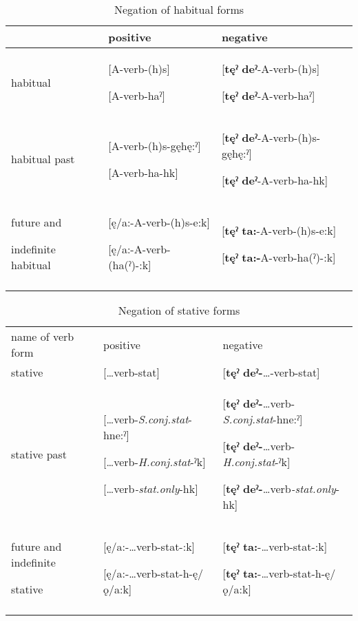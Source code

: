 \begin{table}
\caption{Negation of habitual forms}
\label{tab:1:habneg}
\scriptsize{
\begin{tabularx}{\textwidth}{XXX} 
\lsptoprule
& positive & negative\\
\midrule

habitual & [A-verb-(h)s]

[A-verb-haˀ] & [\textbf{tęˀ} \textbf{deˀ}{}-A-verb-(h)s]

[\textbf{tęˀ} \textbf{deˀ}{}-A-verb-haˀ]\\
habitual past & [A-verb-(h)s-gęhę:ˀ]

[A-verb-ha-hk] & [\textbf{tęˀ} \textbf{deˀ}{}-A-verb-(h)s-gęhę:ˀ]

[\textbf{tęˀ} \textbf{deˀ}{}-A-verb-ha-hk]\\
future and 

indefinite habitual & [ę/a:-A-verb-(h)s-e:k]

[ę/a:-A-verb-(ha(ˀ)-:k] & [\textbf{tęˀ} \textbf{ta:}{}-A-verb-(h)s-e:k]

[\textbf{tęˀ} \textbf{ta:-}A-verb-ha(ˀ)-:k]\\
\lspbottomrule
\end{tabularx}}
\end{table}


\begin{table}
\caption{Negation of stative forms}
\label{tab:1:statneg}
\scriptsize{
\begin{tabularx}{\textwidth}{XXX}
\lsptoprule

name of verb form & positive & negative\\
stative & […verb-stat] & [\textbf{tęˀ} \textbf{deˀ-}…-verb-stat]\\
\midrule
stative past & […verb-\textit{S.conj.stat}{}-hne:ˀ]

[…verb-\textit{H.conj.stat}{}-ˀk]

[…verb\textit{{}-stat.only}{}-hk] & [\textbf{tęˀ} \textbf{deˀ-}…verb-\textit{S.conj.stat}{}-hne:ˀ]

[\textbf{tęˀ} \textbf{deˀ-}…verb-\textit{H.conj.stat}{}-ˀk]

[\textbf{tęˀ} \textbf{deˀ-}…verb\textit{{}-stat.only}{}-hk]\\
future and indefinite

stative & [ę/a:-…verb-stat-:k]

[ę/a:-…verb-stat-h-ę/ǫ/a:k] & [\textbf{tęˀ} \textbf{ta:}{}-…verb-stat-:k]

[\textbf{tęˀ} \textbf{ta:}{}-…verb-stat-h-ę/ǫ/a:k]\\
\lspbottomrule
\end{tabularx}}
\end{table}

